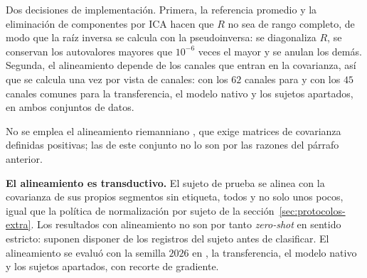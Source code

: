 Dos decisiones de implementación. Primera, la referencia promedio y la eliminación de
componentes por ICA hacen que $R$ no sea de rango completo, de modo que la raíz inversa se
calcula con la pseudoinversa: se diagonaliza $R$, se conservan los autovalores mayores que
$10^{-6}$ veces el mayor y se anulan los demás. Segunda, el alineamiento depende de los
canales que entran en la covarianza, así que se calcula una vez por vista de canales: con
los $62$ canales para \loso{} y con los $45$ canales comunes para la transferencia, el
modelo nativo y los sujetos apartados, en ambos conjuntos de datos.

No se emplea el alineamiento riemanniano \cite{zanini2018}, que exige matrices de
covarianza definidas positivas; las de este conjunto no lo son por las razones del párrafo
anterior.

\textbf{El alineamiento es transductivo.} El sujeto de prueba se alinea con la covarianza de
sus propios segmentos sin etiqueta, todos y no solo unos pocos, igual que la política de
normalización por sujeto de la sección~\ref{sec:protocolos-extra}. Los resultados con
alineamiento no son por tanto \textit{zero-shot} en sentido estricto: suponen disponer de los
registros del sujeto antes de clasificar. El alineamiento se evaluó con la semilla $2026$ en
\loso{}, la transferencia, el modelo nativo y los sujetos apartados, con recorte de
gradiente.


